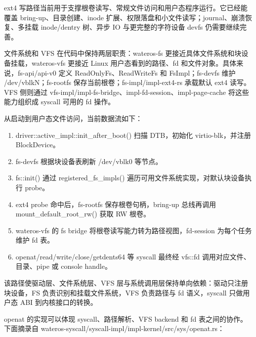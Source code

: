 \documentclass[12pt,openany,oneside,AutoFakeBold=true]{ctexbook}
\newcommand{\code}[1]{\textnormal{\rmfamily #1}}
\newcommand{\syscall}[1]{\textnormal{\rmfamily #1}}
\begin{document}
ext4 写路径当前用于支撑根卷读写、常规文件访问和用户态程序运行。它已经能覆盖 bring-up、目录创建、inode 扩展、权限落盘和小文件读写；journal、崩溃恢复、多挂载 inode/dentry 树、异步 IO 与更完整的字符设备 devfs 仍需要继续完善。

文件系统和 VFS 在代码中保持两层职责：\code{wateros-fs} 更接近具体文件系统和块设备挂载，\code{wateros-vfs} 更接近 Linux 用户态看到的路径、fd 和文件对象。具体来说，\code{fs-api/api-v0} 定义 \code{ReadOnlyFs}、\code{ReadWriteFs} 和 \code{FsImpl}；\code{fs-devfs} 维护 \code{/dev/vblkN}；\code{fs-rootfs} 保存当前根卷；\code{fs-impl/impl-ext4-rs} 承载默认 ext4 读写。VFS 侧则通过 \code{vfs-impl/impl-fs-bridge}、\code{impl-fd-session}、\code{impl-page-cache} 将这些能力组织成 syscall 可用的 fd 操作。

从启动到用户态文件访问，当前数据流如下：

\begin{enumerate}
  \item \code{driver::active\_impl::init\_after\_boot()} 扫描 DTB，初始化 virtio-blk，并注册 \code{BlockDevice}。
  \item \code{fs-devfs} 根据块设备表刷新 \code{/dev/vblk0} 等节点。
  \item \code{fs::init()} 通过 \code{registered\_fs\_impls()} 遍历可用文件系统实现，对默认块设备执行 \code{probe}。
  \item ext4 probe 命中后，\code{fs-rootfs} 保存根卷句柄，bring-up 总线再调用 \code{mount\_default\_root\_rw()} 获取 RW 根卷。
  \item \code{wateros-vfs} 的 fs bridge 将根卷读写能力转为路径视图，\code{fd-session} 为每个任务维护 fd 表。
  \item \syscall{openat/read/write/close/getdents64} 等 syscall 最终经 \code{vfs::fd} 调用对应文件、目录、pipe 或 console handle。
\end{enumerate}

该路径使驱动层、文件系统层、VFS 层与系统调用层保持单向依赖：驱动只注册块设备，FS 负责识别和挂载文件系统，VFS 负责路径与 fd 语义，syscall 只做用户态 ABI 到内核接口的转换。

\syscall{openat} 的实现可以体现 syscall、路径解析、VFS backend 和 fd 表之间的协作。下面摘录自 \code{wateros-syscall/syscall-impl/impl-kernel/src/sys/openat.rs}：
\end{document}
